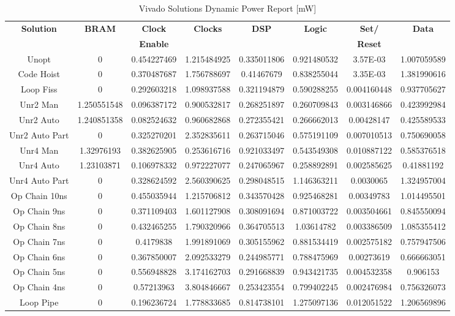 \begin{table}[H]
	\centering
	\begin{tabular}{|c|c|c|c|c|c|c|c|}
		\hline
		\textbf{Solution} & \textbf{BRAM} & \textbf{Clock} & \textbf{Clocks} & \textbf{DSP} & \textbf{Logic} & \textbf{Set/}& \textbf{Data} \\
		& & \textbf{Enable} & & & & \textbf{Reset} & \\
		\hline
		Unopt & 0 & 0.454227469 & 1.215484925 & 0.335011806 & 0.921480532 & 3.57E-03 & 1.007059589 \\
		Code Hoist & 0 & 0.370487687 & 1.756788697 & 0.41467679 & 0.838255044 & 3.35E-03 & 1.381990616 \\
		Loop Fiss & 0 & 0.292603218 & 1.098937588 & 0.321194879 & 0.590288255 & 0.004160448 & 0.937705627 \\
		Unr2 Man & 1.250551548 & 0.096387172 & 0.900532817 & 0.268251897 & 0.260709843 & 0.003146866 & 0.423992984 \\
		Unr2 Auto & 1.240851358 & 0.082524632 & 0.960682868 & 0.272355421 & 0.266662013 & 0.00428147 & 0.425589533 \\
		Unr2 Auto Part & 0 & 0.325270201 & 2.352835611 & 0.263715046 & 0.575191109 & 0.007010513 & 0.750690058 \\
		Unr4 Man & 1.32976193 & 0.382625905 & 0.253616716 & 0.921033497 & 0.543549308 & 0.010887122 & 0.585376518 \\
		Unr4 Auto & 1.23103871 & 0.106978332 & 0.972227077 & 0.247065967 & 0.258892891 & 0.002585625 & 0.41881192 \\
		Unr4 Auto Part & 0 & 0.328624592 & 2.560390625 & 0.298048515 & 1.146363211 & 0.0030065 & 1.324957004 \\
		Op Chain 10ns & 0 & 0.455035944 & 1.215706812 & 0.343570428 & 0.925468281 & 0.00349783 & 1.014495501 \\
		Op Chain 9ns & 0 & 0.371109403 & 1.601127908 & 0.308091694 & 0.871003722 & 0.003504661 & 0.845550094 \\
		Op Chain 8ns & 0 & 0.432465255 & 1.790320966 & 0.364705513 & 1.03614782 & 0.003386509 & 1.085355412 \\
		Op Chain 7ns & 0 & 0.4179838 & 1.991891069 & 0.305155962 & 0.881534419 & 0.002575182 & 0.757947506 \\
		Op Chain 6ns & 0 & 0.367850007 & 2.092533279 & 0.244985771 & 0.788475969 & 0.00273619 & 0.666663051 \\
		Op Chain 5ns & 0 & 0.556948828 & 3.174162703 & 0.291668839 & 0.943421735 & 0.004532358 & 0.906153 \\
		Op Chain 4ns & 0 & 0.57213963 & 3.804846667 & 0.253423554 & 0.799402245 & 0.002476984 & 0.756326073 \\
		Loop Pipe & 0 & 0.196236724 & 1.778833685 & 0.814738101 & 1.275097136 & 0.012051522 & 1.206569896 \\
		\hline
	\end{tabular}
	\caption{Vivado Solutions Dynamic Power Report [mW]}
	\label{tab:vivado-solutions-dynamic-power-report}
\end{table}

